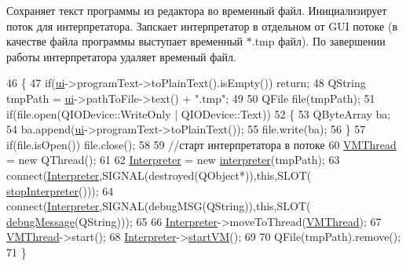 Сохраняет текст программы из редактора во временный файл. Инициализирует поток для интерпретатора. Запскает интерпретатор в отдельном от G\+UI потоке (в качестве файла программы выступает временный $\ast$.tmp файл). По завершении работы интерпретатора удаляет временый файл. 
\begin{DoxyCode}
46 \{    
47     \textcolor{keywordflow}{if}(\hyperlink{class_main_window_a35466a70ed47252a0191168126a352a5}{ui}->programText->toPlainText().isEmpty()) \textcolor{keywordflow}{return};
48     QString tmpPath = \hyperlink{class_main_window_a35466a70ed47252a0191168126a352a5}{ui}->pathToFile->text() + \textcolor{stringliteral}{".tmp"};
49 
50     QFile file(tmpPath);
51     \textcolor{keywordflow}{if}(file.open(QIODevice::WriteOnly | QIODevice::Text))
52     \{
53         QByteArray ba;
54         ba.append(\hyperlink{class_main_window_a35466a70ed47252a0191168126a352a5}{ui}->programText->toPlainText());
55         file.write(ba);
56     \}
57     \textcolor{keywordflow}{if}(file.isOpen()) file.close();
58 
59     \textcolor{comment}{//старт интерпретатора в потоке}
60     \hyperlink{class_main_window_aa16438ee9c972be8c7231f2d376dafb7}{VMThread} = \textcolor{keyword}{new} QThread();
61 
62     \hyperlink{class_main_window_ab42a1f6ee7d167221b9b5078b2ba38a7}{Interpreter} = \textcolor{keyword}{new} \hyperlink{classinterpreter}{interpreter}(tmpPath);
63     connect(\hyperlink{class_main_window_ab42a1f6ee7d167221b9b5078b2ba38a7}{Interpreter},SIGNAL(destroyed(QObject*)),\textcolor{keyword}{this},SLOT(
      \hyperlink{class_main_window_a123b5275e6bb8411973a2f2be7b8b45f}{stopInterpreter}()));
64     connect(\hyperlink{class_main_window_ab42a1f6ee7d167221b9b5078b2ba38a7}{Interpreter},SIGNAL(debugMSG(QString)),\textcolor{keyword}{this},SLOT(
      \hyperlink{class_main_window_ac29732293ed85bb092764df7b93fefbc}{debugMessage}(QString)));
65 
66     \hyperlink{class_main_window_ab42a1f6ee7d167221b9b5078b2ba38a7}{Interpreter}->moveToThread(\hyperlink{class_main_window_aa16438ee9c972be8c7231f2d376dafb7}{VMThread});
67     \hyperlink{class_main_window_aa16438ee9c972be8c7231f2d376dafb7}{VMThread}->start();
68     \hyperlink{class_main_window_ab42a1f6ee7d167221b9b5078b2ba38a7}{Interpreter}->\hyperlink{classinterpreter_af9ed8afd864c69cfd1ec1e849b2d1542}{startVM}();
69 
70     QFile(tmpPath).remove();
71 \}
\end{DoxyCode}
\hypertarget{class_main_window_a123b5275e6bb8411973a2f2be7b8b45f}{}\label{class_main_window_a123b5275e6bb8411973a2f2be7b8b45f} 
